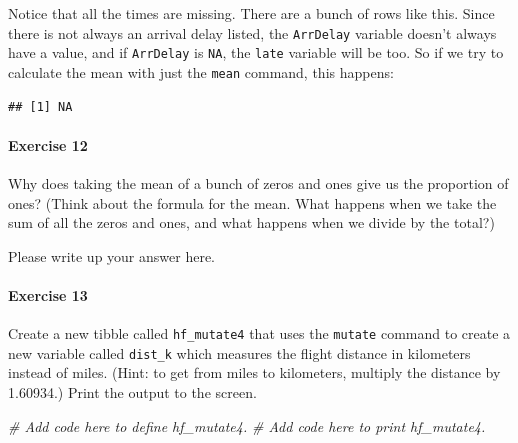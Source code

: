 \documentclass[
]{book}
\newenvironment{Shaded}{\begin{snugshade}}{\end{snugshade}}
\newcommand{\CommentTok}[1]{\textcolor[rgb]{0.56,0.35,0.01}{\textit{#1}}}
\newcommand{\FunctionTok}[1]{\textcolor[rgb]{0.00,0.00,0.00}{#1}}
\newcommand{\NormalTok}[1]{#1}
\newcommand{\SpecialCharTok}[1]{\textcolor[rgb]{0.00,0.00,0.00}{#1}}
\begin{document}
Notice that all the times are missing. There are a bunch of rows like this. Since there is not always an arrival delay listed, the \texttt{ArrDelay} variable doesn't always have a value, and if \texttt{ArrDelay} is \texttt{NA}, the \texttt{late} variable will be too. So if we try to calculate the mean with just the \texttt{mean} command, this happens:

\begin{Shaded}
\end{Shaded}

\begin{verbatim}
## [1] NA
\end{verbatim}

\hypertarget{exercise-12-2}{%
\paragraph*{Exercise 12}\label{exercise-12-2}}

Why does taking the mean of a bunch of zeros and ones give us the proportion of ones? (Think about the formula for the mean. What happens when we take the sum of all the zeros and ones, and what happens when we divide by the total?)

Please write up your answer here.

\hypertarget{exercise-13}{%
\paragraph*{Exercise 13}\label{exercise-13}}

Create a new tibble called \texttt{hf\_mutate4} that uses the \texttt{mutate} command to create a new variable called \texttt{dist\_k} which measures the flight distance in kilometers instead of miles. (Hint: to get from miles to kilometers, multiply the distance by 1.60934.) Print the output to the screen.

\begin{Shaded}
\begin{Highlighting}[]
\CommentTok{\# Add code here to define hf\_mutate4.}
\CommentTok{\# Add code here to print hf\_mutate4.}
\end{Highlighting}
\end{Shaded}
\end{document}
